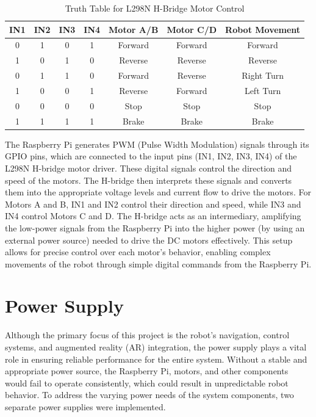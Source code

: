 \begin{table}[h]
	\centering
	\begin{tabular}{|c|c|c|c|c|c|c|}
		\hline
		\textbf{IN1} & \textbf{IN2} & \textbf{IN3} & \textbf{IN4} & \textbf{Motor A/B} & \textbf{Motor C/D} & \textbf{Robot Movement} \\
		\hline
		0 & 1 & 0 & 1 & Forward & Forward & Forward \\
		\hline
		1 & 0 & 1 & 0 & Reverse & Reverse & Reverse \\
		\hline
		0 & 1 & 1 & 0 & Forward & Reverse & Right Turn \\
		\hline
		1 & 0 & 0 & 1 & Reverse & Forward & Left Turn \\
		\hline
		0 & 0 & 0 & 0 & Stop & Stop & Stop \\
		\hline
		1 & 1 & 1 & 1 & Brake & Brake & Brake \\
		\hline
	\end{tabular}
	\caption{Truth Table for L298N H-Bridge Motor Control}
	\label{tab:condensed_hbridge_control}
\end{table}

The Raspberry Pi generates PWM (Pulse Width Modulation) signals through its GPIO pins, which are connected to the input pins (IN1, IN2, IN3, IN4) of the L298N H-bridge motor driver. These digital signals control the direction and speed of the motors. The H-bridge then interprets these signals and converts them into the appropriate voltage levels and current flow to drive the motors. For Motors A and B, IN1 and IN2 control their direction and speed, while IN3 and IN4 control Motors C and D. The H-bridge acts as an intermediary, amplifying the low-power signals from the Raspberry Pi into the higher power (by using an external power source) needed to drive the DC motors effectively. This setup allows for precise control over each motor's behavior, enabling complex movements of the robot through simple digital commands from the Raspberry Pi.

\section{Power Supply}

Although the primary focus of this project is the robot's navigation, control systems, and augmented reality (AR) integration, the power supply plays a vital role in ensuring reliable performance for the entire system. Without a stable and appropriate power source, the Raspberry Pi, motors, and other components would fail to operate consistently, which could result in unpredictable robot behavior. To address the varying power needs of the system components, two separate power supplies were implemented.

